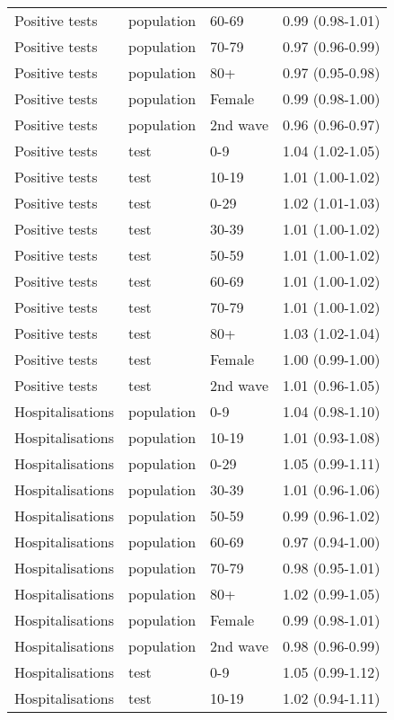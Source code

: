 \documentclass{article}
\begin{document}
\begin{longtable}{llll}
		Positive tests & population & 60-69 & 0.99 (0.98-1.01) \\ 
		Positive tests & population & 70-79 & 0.97 (0.96-0.99) \\ 
		Positive tests & population & 80+ & 0.97 (0.95-0.98) \\ 
		Positive tests & population & Female & 0.99 (0.98-1.00) \\ 
		Positive tests & population & 2nd wave & 0.96 (0.96-0.97) \\ 
		Positive tests & test & 0-9 & 1.04 (1.02-1.05) \\ 
		Positive tests & test & 10-19 & 1.01 (1.00-1.02) \\ 
		Positive tests & test & 0-29 & 1.02 (1.01-1.03) \\ 
		Positive tests & test & 30-39 & 1.01 (1.00-1.02) \\ 
		Positive tests & test & 50-59 & 1.01 (1.00-1.02) \\ 
		Positive tests & test & 60-69 & 1.01 (1.00-1.02) \\ 
		Positive tests & test & 70-79 & 1.01 (1.00-1.02) \\ 
		Positive tests & test & 80+ & 1.03 (1.02-1.04) \\ 
		Positive tests & test & Female & 1.00 (0.99-1.00) \\ 
		Positive tests & test & 2nd wave & 1.01 (0.96-1.05) \\ 
		Hospitalisations & population & 0-9 & 1.04 (0.98-1.10) \\ 
		Hospitalisations & population & 10-19 & 1.01 (0.93-1.08) \\ 
		Hospitalisations & population & 0-29 & 1.05 (0.99-1.11) \\ 
		Hospitalisations & population & 30-39 & 1.01 (0.96-1.06) \\ 
		Hospitalisations & population & 50-59 & 0.99 (0.96-1.02) \\ 
		Hospitalisations & population & 60-69 & 0.97 (0.94-1.00) \\ 
		Hospitalisations & population & 70-79 & 0.98 (0.95-1.01) \\ 
		Hospitalisations & population & 80+ & 1.02 (0.99-1.05) \\ 
		Hospitalisations & population & Female & 0.99 (0.98-1.01) \\ 
		Hospitalisations & population & 2nd wave & 0.98 (0.96-0.99) \\ 
		Hospitalisations & test & 0-9 & 1.05 (0.99-1.12) \\ 
		Hospitalisations & test & 10-19 & 1.02 (0.94-1.11) \\ 

\end{longtable}
\end{document}
